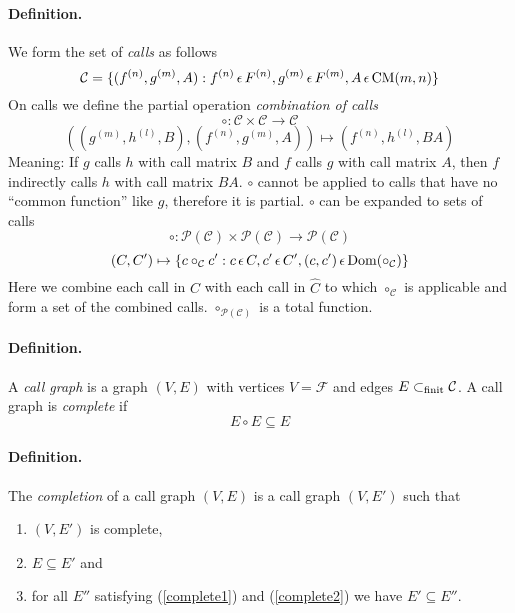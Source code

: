 \paragraph*{Definition.}
We form the set of {\em calls} as follows
$$
   \mathcal{C} = \{ (f^{(n)}, g^{(m)}, A) : f^{(n)} \,\epsilon\, F^{(n)},
   g^{(m)} \,\epsilon\, F^{(m)}, A \,\epsilon\, \mathrm{CM}(m,n) \}
$$
On calls we define the partial operation {\em combination of calls}
$$
   \circ : \mathcal{C} \times \mathcal{C} \rightarrow \mathcal{C}
$$
$$
   \left( (g^{(m)}, h^{(l)}, B), (f^{(n)}, g^{(m)}, A) \right) \mapsto
   (f^{(n)}, h^{(l)}, BA)
$$
Meaning: If $g$ calls $h$ with call matrix $B$ and $f$ calls $g$ with
call matrix $A$, then $f$ indirectly calls $h$ with call matrix
$BA$. $\circ$ cannot be applied to calls that have no ``common
function'' like $g$, therefore it is partial. $\circ$ can be expanded
to sets of calls
$$
   \circ : \mathcal{P}(\mathcal{C}) \times \mathcal{P}(\mathcal{C})
   \rightarrow \mathcal{P}(\mathcal{C})
$$
$$
   (C, C') \mapsto \{ c \circ_{\mathcal{C}} c' : c \,\epsilon\, C,
       c' \,\epsilon\, C',
       (c,c') \,\epsilon\, \mathrm{Dom}(\circ_{\mathcal{C}}) \}
$$
Here we combine each call in $C$ with each call in $\hat C$ to which
$\circ_{\mathcal{C}}$ is applicable and form a set of the combined
calls. $\circ_{\mathcal{P}(\mathcal{C})}$ is a total function.
\paragraph*{Definition.}
A {\em call graph} is a graph $(V,E)$ with
vertices $V = \mathcal F$ and edges $E \subset_{\mathrm{finit}} \mathcal{C}$.
A call graph is {\em complete} if
$$
    E \circ E \subseteq E
$$

\paragraph*{Definition.}
The {\em completion} of a call graph $(V,E)$ is a call graph $(V,E')$
such that
\renewcommand{\labelenumi}{(\arabic{enumi})}
\begin{enumerate}
\item $(V,E')$ is complete,\label{complete1}
\item $E \subseteq E'$ and\label{complete2}
\item for all $E''$ satisfying (\ref{complete1}) and
  (\ref{complete2}) we have $E' \subseteq E''$.
\end{enumerate}

